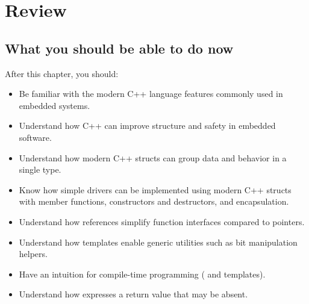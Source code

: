 
\section{Review}
\label{c1:sec:review}

\subsection*{What you should be able to do now}
After this chapter, you should:
\begin{itemize}
  \item Be familiar with the modern C++ language features commonly used in embedded systems.
  \item Understand how C++ can improve structure and safety in embedded software.
  \item Understand how modern C++ structs can group data and behavior in a single type.
  \item Know how simple drivers can be implemented using modern C++ structs with member functions,
    constructors and destructors, and encapsulation.
  \item Understand how references simplify function interfaces compared to pointers.
  \item Understand how templates enable generic utilities such as bit manipulation helpers.
  \item Have an intuition for compile-time programming ( and templates).
  \item Understand how  expresses a return value that may be absent.
\end{itemize}

